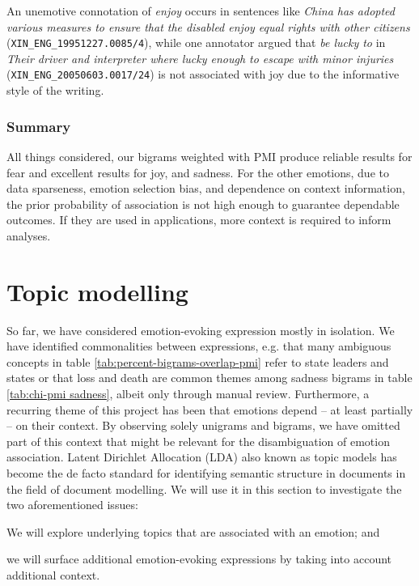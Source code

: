 An unemotive connotation of \textit{enjoy} occurs in sentences like \textit{China has adopted various measures to ensure that the disabled enjoy equal rights with other citizens} (\texttt{XIN\_ENG\_19951227.0085/4}), while one annotator argued that \textit{be lucky to} in \textit{Their driver and interpreter where lucky enough to escape with minor injuries} (\texttt{XIN\_ENG\_20050603.0017/24}) is not associated with joy due to the informative style of the writing.

\subsubsection{Summary}

All things considered, our bigrams weighted with PMI produce reliable results for fear and excellent results for joy, and sadness. For the other emotions, due to data sparseness, emotion selection bias, and dependence on context information, the prior probability of association is not high enough to guarantee dependable outcomes. If they are used in applications, more context is required to inform analyses.

\section{Topic modelling} \label{sec:topic_modelling}

So far, we have considered emotion-evoking expression mostly in isolation. We have identified commonalities between expressions, e.g. that many ambiguous concepts in table \ref{tab:percent-bigrams-overlap-pmi} refer to state leaders and states or that loss and death are common themes among sadness bigrams in table \ref{tab:chi-pmi sadness}, albeit only through manual review.
Furthermore, a recurring theme of this project has been that emotions depend -- at least partially -- on their context. By observing solely unigrams and bigrams, we have omitted part of this context that might be relevant for the disambiguation of emotion association.
Latent Dirichlet Allocation (LDA) also known as topic models has become the de facto standard for identifying semantic structure in documents in the field of document modelling. We will use it in this section to investigate the two aforementioned issues:\begin{inparaenum} \item We will explore underlying topics that are associated with an emotion; and \item we will surface additional emotion-evoking expressions by taking into account additional context. \end{inparaenum}

